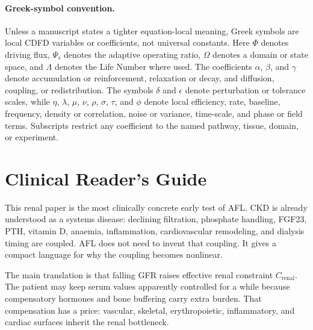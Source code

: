 \documentclass[12pt,a4paper]{article}
\begin{document}
\begin{abstract}
\textbf{Status: Inferred}

\medskip
\noindent Within the extended framework of this series, biological networks are modeled as \emph{Adaptive Surfaces} that dynamically integrate physiological load and retain structural memory. The system's health is governed by the adaptive ratio $\Psi_s = (\Phi/C) \cdot S \cdot M_s$, where homeostasis ($\Psi_s \approx 1.0$) is maintained near the stable attractor ($S \cdot M_s \approx 1.0$), and disease emerges as surface dysregulation when maladaptive memory locks tissues into chronic constraint.

\end{abstract}


\paragraph{Greek-symbol convention.}
Unless a manuscript states a tighter equation-local meaning, Greek symbols are local CDFD variables or coefficients, not universal constants. Here $\Phi$ denotes driving flux, $\Psi_s$ denotes the adaptive operating ratio, $\Omega$ denotes a domain or state space, and $\Lambda$ denotes the Life Number where used. The coefficients $\alpha$, $\beta$, and $\gamma$ denote accumulation or reinforcement, relaxation or decay, and diffusion, coupling, or redistribution. The symbols $\delta$ and $\epsilon$ denote perturbation or tolerance scales, while $\eta$, $\lambda$, $\mu$, $\nu$, $\rho$, $\sigma$, $\tau$, and $\phi$ denote local efficiency, rate, baseline, frequency, density or correlation, noise or variance, time-scale, and phase or field terms. Subscripts restrict any coefficient to the named pathway, tissue, domain, or experiment.

\section*{Clinical Reader's Guide}
This renal paper is the most clinically concrete early test of AFL. CKD is already understood as a systems disease: declining filtration, phosphate handling, FGF23, PTH, vitamin D, anaemia, inflammation, cardiovascular remodeling, and dialysis timing are coupled. AFL does not need to invent that coupling. It gives a compact language for why the coupling becomes nonlinear.

The main translation is that falling GFR raises effective renal constraint $C_{\mathrm{renal}}$. The patient may keep serum values apparently controlled for a while because compensatory hormones and bone buffering carry extra burden. That compensation has a price: vascular, skeletal, erythropoietic, inflammatory, and cardiac surfaces inherit the renal bottleneck.
\end{document}
